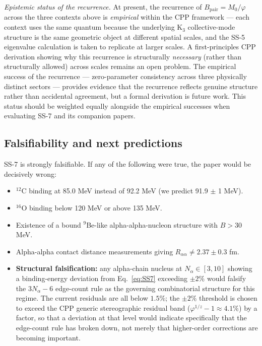 \documentclass[11pt,letterpaper]{article}
\newcommand{\phig}{\varphi}
\newcommand{\Mzero}{M_0}
\newcommand{\Bpair}{B_{\mathrm{pair}}}
\newcommand{\Nalpha}{N_{\alpha}}
\newcommand{\Raa}{R_{\alpha\alpha}}
\begin{document}
\emph{Epistemic status of the recurrence.} At present, the recurrence of $\Bpair = \Mzero/\phig$ across the three contexts above is \emph{empirical} within the CPP framework --- each context uses the same quantum because the underlying K$_3$ collective-mode structure is the same geometric object at different spatial scales, and the SS-5 eigenvalue calculation is taken to replicate at larger scales. A first-principles CPP derivation showing why this recurrence is structurally \emph{necessary} (rather than structurally allowed) across scales remains an open problem. The empirical success of the recurrence --- zero-parameter consistency across three physically distinct sectors --- provides evidence that the recurrence reflects genuine structure rather than accidental agreement, but a formal derivation is future work. This status should be weighted equally alongside the empirical successes when evaluating SS-7 and its companion papers.

\subsection{Falsifiability and next predictions}

SS-7 is strongly falsifiable. If any of the following were true, the paper would be decisively wrong:
\begin{itemize}
\item ${}^{12}$C binding at 85.0 MeV instead of 92.2 MeV (we predict 91.9 $\pm$ 1 MeV).
\item ${}^{16}$O binding below 120 MeV or above 135 MeV.
\item Existence of a bound ${}^9$Be-like alpha-alpha-nucleon structure with $B > 30$ MeV.
\item Alpha-alpha contact distance measurements giving $\Raa \ne 2.37 \pm 0.3$ fm.
\item \textbf{Structural falsification:} any alpha-chain nucleus at $\Nalpha \in [3, 10]$ showing a binding-energy deviation from Eq.~\ref{eq:SS7} exceeding $\pm 2\%$ would falsify the $3\Nalpha - 6$ edge-count rule as the governing combinatorial structure for this regime. The current residuals are all below $1.5\%$; the $\pm 2\%$ threshold is chosen to exceed the CPP generic stereographic residual band ($\phig^{1/z} - 1 \approx 4.1\%$) by a factor, so that a deviation at that level would indicate specifically that the edge-count rule has broken down, not merely that higher-order corrections are becoming important.
\end{itemize}
\end{document}
